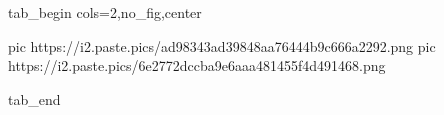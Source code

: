  
 
 
 
 

\ifcmt
  tab_begin cols=2,no_fig,center

     pic https://i2.paste.pics/ad98343ad39848aa76444b9c666a2292.png
		 pic https://i2.paste.pics/6e2772dccba9e6aaa481455f4d491468.png

  tab_end
\fi
